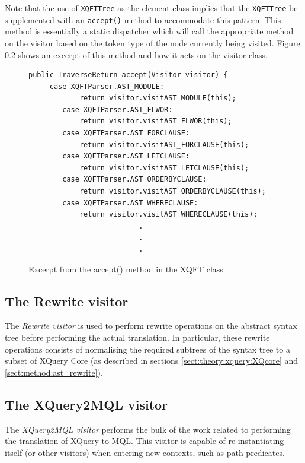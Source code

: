 Note that the use of \texttt{XQFTTree} as the element class implies that the
\texttt{XQFTTree} be supplemented with an \texttt{accept()} method to
accommodate this pattern. This method is essentially a static dispatcher which
will call the appropriate method on the visitor based on the token type of the
node currently being visited. Figure \ref{} shows an excerpt of this method and
how it acts on the visitor class.

\begin{figure}[htp]
\begin{center}
  \begin{Verbatim}	
public TraverseReturn accept(Visitor visitor) {
     case XQFTParser.AST_MODULE:
            return visitor.visitAST_MODULE(this);
        case XQFTParser.AST_FLWOR:
            return visitor.visitAST_FLWOR(this);
        case XQFTParser.AST_FORCLAUSE:
            return visitor.visitAST_FORCLAUSE(this);
        case XQFTParser.AST_LETCLAUSE:
            return visitor.visitAST_LETCLAUSE(this);
        case XQFTParser.AST_ORDERBYCLAUSE:
            return visitor.visitAST_ORDERBYCLAUSE(this);
        case XQFTParser.AST_WHERECLAUSE:
            return visitor.visitAST_WHERECLAUSE(this);
                          .
                          .
                          .
  \end{Verbatim}
  \caption{Excerpt from the accept() method in the XQFT class}
  \label{figureLabel}
\end{center}
\end{figure}

\subsection{The Rewrite visitor}
The \textit{Rewrite visitor} is used to perform rewrite operations on the
abstract syntax tree before performing the actual translation. In particular,
these rewrite operations consists of normalising the required subtrees of the
syntax tree to a subset of XQuery Core (as described in sections
\ref{sect:theory:xquery:XQcore} and \ref{sect:method:ast_rewrite}).

\subsection{The XQuery2MQL visitor}
The \textit{XQuery2MQL visitor} performs the bulk of the work related to
performing the translation of XQuery to MQL. This visitor is capable of
re-instantiating itself (or other visitors) when entering new contexts, such as
path predicates. 